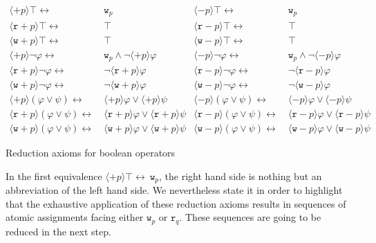 \documentclass{llncs}
\newcommand{\readable}[1]{\mathtt{r}_{#1}}
\newcommand{\writable}[1]{\mathtt{w}_{#1}}
\newcommand{\assgntopR}[1]{{\mathtt r {+} #1}}
\newcommand{\assgnbotR}[1]{{\mathtt r {-} #1}}
\newcommand{\assgntopW}[1]{{\mathtt w {+} #1}}
\newcommand{\assgnbotW}[1]{{\mathtt w {-} #1}}
\newcommand{\assgntopV}[1]{{\mathtt {+} #1}}
\newcommand{\assgnbotV}[1]{{\mathtt {-} #1}}
\newcommand{\ldia}[1]{ \big\langle #1 \big\rangle}
\newcommand{\leqv}{ \leftrightarrow }
\renewcommand{\phi}{\varphi}
\begin{document}
\begin{table}[t]
\begin{align*}
\ldia{\assgntopV p} \top \leqv &\  \writable p
& \ldia{\assgnbotV p} \top \leqv &\  \writable p
\\
\ldia{\assgntopR p} \top \leqv &\ \top
& \ldia{\assgnbotR p} \top \leqv &\ \top
\\
\ldia{\assgntopW p} \top \leqv &\ \top
& \ldia{\assgnbotW p} \top \leqv &\ \top
%
\\
\ldia{\assgntopV p } \lnot \phi \leqv &\ 
					\writable{p} \land \lnot \ldia{\assgntopV p } \phi  
& \ldia{\assgnbotV p } \lnot \phi \leqv &\ 
					\writable{p} \land \lnot \ldia{\assgnbotV p } \phi 
\\
\ldia{\assgntopR p } \lnot \phi \leqv &\ 
					\lnot \ldia{\assgntopR p } \phi  
& \ldia{\assgnbotR p } \lnot \phi \leqv &\ 
					\lnot \ldia{\assgnbotR p } \phi 
\\
\ldia{\assgntopW p } \lnot \phi \leqv &\ 
					\lnot \ldia{\assgntopW p } \phi  
& \ldia{\assgnbotW p } \lnot \phi \leqv &\ 
					\lnot \ldia{\assgnbotW p } \phi 
%
\\
\ldia{\assgntopV p } (\phi \lor \psi) \leqv &\ \ldia{\assgntopV p } \phi \lor \ldia{\assgntopV p } \psi 
& \ldia{\assgnbotV p } (\phi \lor \psi) \leqv &\ \ldia{\assgnbotV p } \phi \lor \ldia{\assgnbotV p } \psi 
\\
\ldia{\assgntopR p } (\phi \lor \psi) \leqv &\ \ldia{\assgntopR p } \phi \lor \ldia{\assgntopR p } \psi 
& \ldia{\assgnbotR p } (\phi \lor \psi) \leqv &\ \ldia{\assgnbotR p } \phi \lor \ldia{\assgnbotR p } \psi 
\\
\ldia{\assgntopW p } (\phi \lor \psi) \leqv &\ \ldia{\assgntopW p } \phi \lor \ldia{\assgntopW p } \psi 
& \ldia{\assgnbotW p } (\phi \lor \psi) \leqv &\ \ldia{\assgnbotW p } \phi \lor \ldia{\assgnbotW p } \psi 
\end{align*}
\caption{Reduction axioms for boolean operators
\label{fig:redax_booleanops}
}
\end{table}

In the first equivalence $\ldia{\assgntopV p} \top \leqv \  \writable p$, 
the right hand side is nothing but an abbreviation of the left hand side. 
We nevertheless state it in order to highlight that the exhaustive application of these reduction axioms 
results in sequences of atomic assignments facing 
either $\writable p$ or $\readable q$. 
These sequences are going to be reduced in the next step. 


\end{document}
